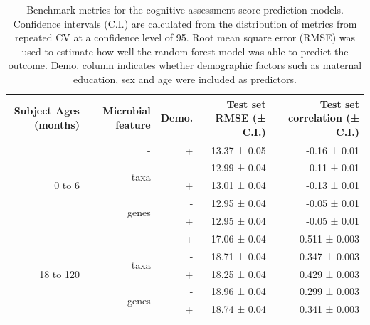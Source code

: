 \documentclass{article}
\begin{document}
\begin{table}[!h]
    \begin{center}
    \begin{tabular}{|r|r|r|r|r|}
      \hline\hline
      \textbf{Subject Ages (months)} & \textbf{Microbial feature} & \textbf{Demo.} & \textbf{Test set RMSE (± C.I.)} & \textbf{Test set correlation (± C.I.)} \\\hline
      \multirow{5}{*}{0 to 6} & -    & + & 13.37 ± 0.05 & -0.16 ± 0.01 \\ \cline{2-5}
            & \multirow{2}{*}{taxa}  & - & 12.99 ± 0.04 & -0.11 ± 0.01 \\ \cline{3-5}
            &                        & + & 13.01 ± 0.04 & -0.13 ± 0.01 \\ \cline{2-5}
            & \multirow{2}{*}{genes} & - & 12.95 ± 0.04 & -0.05 ± 0.01 \\ \cline{3-5}
            &                        & + & 12.95 ± 0.04 & -0.05 ± 0.01 \\ \cline{1-5}
      \multirow{5}{*}{18 to 120} & - & + & 17.06 ± 0.04 & 0.511 ± 0.003 \\ \cline{2-5}
            & \multirow{2}{*}{taxa}  & - & 18.71 ± 0.04 & 0.347 ± 0.003 \\ \cline{3-5}
            &                        & + & 18.25 ± 0.04 & 0.429 ± 0.003 \\ \cline{2-5}
            & \multirow{2}{*}{genes} & - & 18.96 ± 0.04 & 0.299 ± 0.003 \\ \cline{3-5}
            &                        & + & 18.74 ± 0.04 & 0.341 ± 0.003 \\ \hline\hline
    \end{tabular}
    \caption{\label{tab:rfbench}Benchmark metrics for the cognitive assessment score
    prediction models. Confidence intervals (C.I.) are calculated from the
    distribution of metrics from repeated CV at a confidence level of 95.
    Root mean square error (RMSE) was used to estimate how well the random forest model was able to predict the outcome.
    Demo. column indicates whether demographic factors such as maternal education, sex and age were included as predictors.}
    \end{center}
\end{table}
\end{document}

